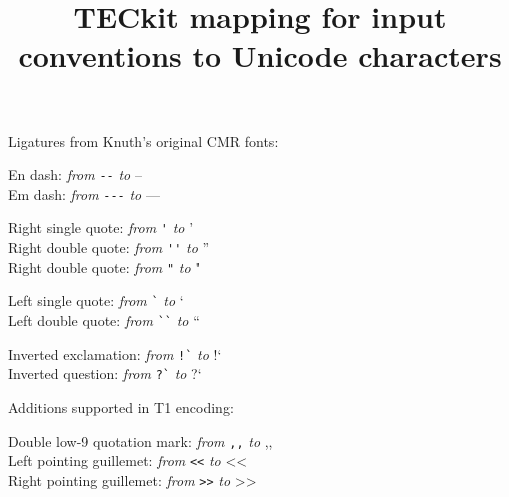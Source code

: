 \documentclass[12pt,a4paper]{article}
\title{TECkit mapping for \hologo{TeX} input conventions to Unicode characters}
\author{}
\date{\relax}
\begin{document}
\maketitle
\thispagestyle{empty}

Ligatures from Knuth's original CMR fonts:
\bigskip\par\noindent

En dash: \textit{from} \verb|--| \textit{to} --\\
Em dash: \textit{from} \verb|---| \textit{to} ---

Right single quote: \textit{from} \verb|'| \textit{to} '\\
Right double quote: \textit{from} \verb|''| \textit{to} ''\\
Right double quote: \textit{from} \verb|"| \textit{to} "

Left single quote: \textit{from} \verb|`| \textit{to} `\\
Left double quote: \textit{from} \verb|``| \textit{to} ``

Inverted exclamation: \textit{from} \verb|!`| \textit{to} !`\\
Inverted question: \textit{from} \verb|?`| \textit{to} ?`
\bigskip\par\noindent

Additions supported in T1 encoding:
\bigskip\par\noindent

Double low-9 quotation mark: \textit{from} \verb|,,| \textit{to} ,,\\
Left pointing guillemet: \textit{from} \verb|<<| \textit{to} <<\\
Right pointing guillemet: \textit{from} \verb|>>| \textit{to} >>
\end{document}
